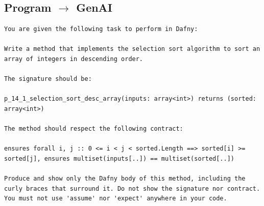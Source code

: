 \documentclass{article}
\begin{document}
\subsection*{Program $\rightarrow$ GenAI}
\begin{lstlisting}
You are given the following task to perform in Dafny:

Write a method that implements the selection sort algorithm to sort an array of integers in descending order.

The signature should be:

p_14_1_selection_sort_desc_array(inputs: array<int>) returns (sorted: array<int>)

The method should respect the following contract:

ensures forall i, j :: 0 <= i < j < sorted.Length ==> sorted[i] >= sorted[j], ensures multiset(inputs[..]) == multiset(sorted[..])

Produce and show only the Dafny body of this method, including the curly braces that surround it. Do not show the signature nor contract. You must not use 'assume' nor 'expect' anywhere in your code.
\end{lstlisting}
\end{document}
